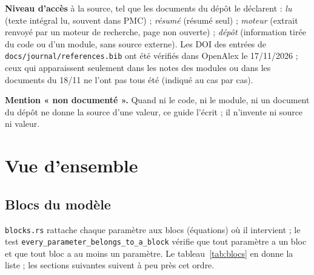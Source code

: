 \documentclass[10pt,a4paper]{article}
\newcommand{\cmd}[1]{\texttt{#1}}
\newcommand{\acc}[1]{\textsl{#1}}
\begin{document}
\textbf{Niveau d'accès} à la source, tel que les documents du dépôt le déclarent :
\acc{lu} (texte intégral lu, souvent dans PMC) ; \acc{résumé} (résumé seul) ; \acc{moteur} (extrait renvoyé par un moteur de recherche, page non ouverte) ; \acc{dépôt} (information tirée du code ou d'un module, sans source externe). Les DOI des entrées de \cmd{docs/journal/references.bib} ont été vérifiés dans OpenAlex le 17/11/2026 ; ceux qui apparaissent seulement dans les notes des modules ou dans les documents du 18/11 ne l'ont pas tous été (indiqué au cas par cas).

\textbf{Mention « non documenté ».} Quand ni le code, ni le module, ni un document du dépôt ne donne la source d'une valeur, ce guide l'écrit ; il n'invente ni source ni valeur.

\section{Vue d'ensemble}

\subsection{Blocs du modèle}
\cmd{blocks.rs} rattache chaque paramètre aux blocs (équations) où il intervient ; le test \cmd{every\_parameter\_belongs\_to\_a\_block} vérifie que tout paramètre a un bloc et que tout bloc a au moins un paramètre. Le tableau~\ref{tab:blocs} en donne la liste ; les sections suivantes suivent à peu près cet ordre.
\end{document}

